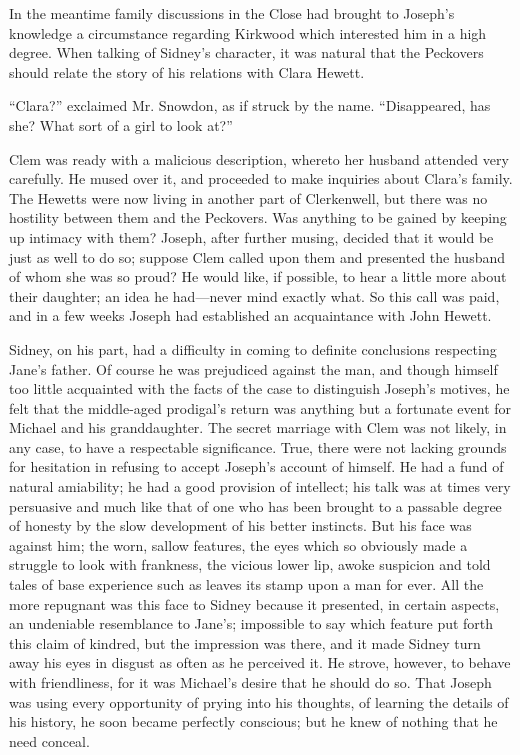 In the meantime family discussions in the Close had brought to Joseph's
knowledge a circumstance regarding Kirkwood which interested him in a
high degree. When talking of Sidney's character, it was natural that the
Peckovers should relate the story of his relations with Clara Hewett.

``Clara?'' exclaimed Mr. Snowdon, as if struck by the name.
``Disappeared, has she? What sort of a girl to look at?''

Clem was ready with a malicious description, whereto her husband
attended very carefully. He mused over it, and proceeded to
{\protect\hypertarget{103}{}{}}make inquiries about Clara's family. The
Hewetts were now living in another part of Clerkenwell, but there was no
hostility between them and the Peckovers. Was anything to be gained by
keeping up intimacy with them? Joseph, after further musing, decided
that it would be just as well to do so; suppose Clem called upon them
and presented the husband of whom she was so proud? He would like, if
possible, to hear a little more about their daughter; an idea he
had---never mind exactly what. So this call was paid, and in a few weeks
Joseph had established an acquaintance with John Hewett.

Sidney, on his part, had a difficulty in coming to definite conclusions
respecting Jane's father. Of course he was prejudiced against the man,
and though himself too little acquainted with the facts of the case to
distinguish Joseph's motives, he felt that the middle-aged prodigal's
return was anything but a fortunate event for Michael and his
granddaughter. The secret marriage with Clem was not likely, in any
case, to have a {\protect\hypertarget{104}{}{}}respectable significance.
True, there were not lacking grounds for hesitation in refusing to
accept Joseph's account of himself. He had a fund of natural amiability;
he had a good provision of intellect; his talk was at times very
persuasive and much like that of one who has been brought to a passable
degree of honesty by the slow development of his better instincts. But
his face was against him; the worn, sallow features, the eyes which so
obviously made a struggle to look with frankness, the vicious lower lip,
awoke suspicion and told tales of base experience such as leaves its
stamp upon a man for ever. All the more repugnant was this face to
Sidney because it presented, in certain aspects, an undeniable
resemblance to Jane's; impossible to say which feature put forth this
claim of kindred, but the impression was there, and it made Sidney turn
away his eyes in disgust as often as he perceived it. He strove,
however, to behave with friendliness, for it was Michael's desire that
he should do so. That Joseph was using every opportunity
{\protect\hypertarget{105}{}{}}of prying into his thoughts, of learning
the details of his history, he soon became perfectly conscious; but he
knew of nothing that he need conceal.


